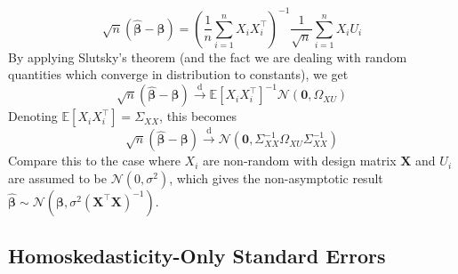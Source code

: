 \documentclass[11pt]{report} %
\begin{document}
\begin{equation}
\sqrt{n}\left(\widehat{\boldsymbol{\beta}} - \boldsymbol{\beta}\right) = \left(\dfrac{1}{n}\sum_{i=1}^{n}X_{i}X_{i}^{\top}\right)^{-1}\dfrac{1}{\sqrt{n}}\sum_{i=1}^{n}X_{i}U_{i}
\end{equation}
By applying Slutsky's theorem (and the fact we are dealing with random quantities which converge in distribution to constants), we get
\begin{equation}
\sqrt{n}\left(\widehat{\boldsymbol{\beta}} - \boldsymbol{\beta}\right) \overset{\mathrm{d}}{\to} \mathbb{E}\left[X_{i}X_{i}^{\top}\right]^{-1}\mathcal{N}\left(\mathbf{0}, \Omega_{XU}\right)
\end{equation}
Denoting $\mathbb{E}\left[X_{i}X_{i}^{\top}\right] = \Sigma_{XX}$, this becomes
\begin{equation}
\sqrt{n}\left(\widehat{\boldsymbol{\beta}} - \boldsymbol{\beta}\right) \overset{\mathrm{d}}{\to} \mathcal{N}\left(\mathbf{0}, \Sigma_{XX}^{-1}\Omega_{XU}\Sigma_{XX}^{-1}\right)
\end{equation}
Compare this to the case where $X_{i}$ are non-random with design matrix $\mathbf{X}$ and $U_{i}$ are assumed to be $\mathcal{N}\left(0, \sigma^{2}\right)$, which gives the non-asymptotic result $\widehat{\boldsymbol{\beta}} \sim \mathcal{N}\left(\boldsymbol{\beta}, \sigma^{2}\left(\mathbf{X}^{\top}\mathbf{X}\right)^{-1}\right)$.

\subsection{Homoskedasticity-Only Standard Errors}
\end{document}

